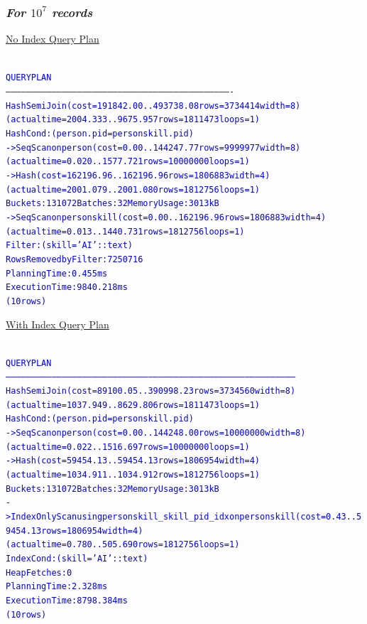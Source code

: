 \documentclass{article}
\begin{document}
    \subsubsection*{\emph{For $10^7$ records}}
    \underline{No Index Query Plan}
    \begin{center}
      {\tiny
      \begin{alltt}
      \textcolor{blue}{
        QUERY PLAN                                                              
        -------------------------------------------------------------------------------------------------------------------------------------
         Hash Semi Join  (cost=191842.00..493738.08 rows=3734414 width=8) (actual time=2004.333..9675.957 rows=1811473 loops=1)
           Hash Cond: (person.pid = personskill.pid)
           ->  Seq Scan on person  (cost=0.00..144247.77 rows=9999977 width=8) (actual time=0.020..1577.721 rows=10000000 loops=1)
           ->  Hash  (cost=162196.96..162196.96 rows=1806883 width=4) (actual time=2001.079..2001.080 rows=1812756 loops=1)
                 Buckets: 131072  Batches: 32  Memory Usage: 3013kB
                 ->  Seq Scan on personskill  (cost=0.00..162196.96 rows=1806883 width=4) (actual time=0.013..1440.731 rows=1812756 loops=1)
                       Filter: (skill = 'AI'::text)
                       Rows Removed by Filter: 7250716
         Planning Time: 0.455 ms
         Execution Time: 9840.218 ms
        (10 rows)
       }
      \end{alltt}
      }
    \end{center}
    \underline{With Index Query Plan}
    \begin{center}
      {\tiny
      \begin{alltt}
      \textcolor{blue}{
        QUERY PLAN                                                                                
        --------------------------------------------------------------------------------------------------------------------------------------------------------------------------
         Hash Semi Join  (cost=89100.05..390998.23 rows=3734560 width=8) (actual time=1037.949..8629.806 rows=1811473 loops=1)
           Hash Cond: (person.pid = personskill.pid)
           ->  Seq Scan on person  (cost=0.00..144248.00 rows=10000000 width=8) (actual time=0.022..1516.697 rows=10000000 loops=1)
           ->  Hash  (cost=59454.13..59454.13 rows=1806954 width=4) (actual time=1034.911..1034.912 rows=1812756 loops=1)
                 Buckets: 131072  Batches: 32  Memory Usage: 3013kB
                 ->  Index Only Scan using personskill_skill_pid_idx on personskill  (cost=0.43..59454.13 rows=1806954 width=4) (actual time=0.780..505.690 rows=1812756 loops=1)
                       Index Cond: (skill = 'AI'::text)
                       Heap Fetches: 0
         Planning Time: 2.328 ms
         Execution Time: 8798.384 ms
        (10 rows)
       }
      \end{alltt}
      }
    \end{center}
\end{document}
